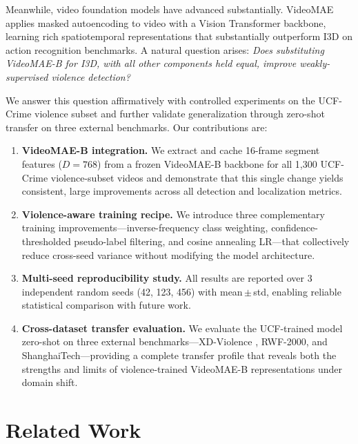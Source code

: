 \documentclass[11pt]{article}
\begin{document}
Meanwhile, video foundation models have advanced substantially.
VideoMAE \citep{tong2022videomae} applies masked autoencoding to video with
a Vision Transformer backbone, learning rich spatiotemporal representations
that substantially outperform I3D on action recognition benchmarks.
A natural question arises: \emph{Does substituting VideoMAE-B for I3D,
with all other components held equal, improve weakly-supervised violence
detection?}

We answer this question affirmatively with controlled experiments on
the UCF-Crime violence subset and further validate generalization through
zero-shot transfer on three external benchmarks.
Our contributions are:

\begin{enumerate}
  \item \textbf{VideoMAE-B integration.}
        We extract and cache 16-frame segment features ($D{=}768$) from a
        frozen VideoMAE-B backbone for all 1{,}300 UCF-Crime violence-subset
        videos and demonstrate that this single change yields consistent,
        large improvements across all detection and localization metrics.

  \item \textbf{Violence-aware training recipe.}
        We introduce three complementary training improvements—inverse-frequency
        class weighting, confidence-thresholded pseudo-label filtering, and
        cosine annealing LR—that collectively reduce cross-seed variance without
        modifying the model architecture.

  \item \textbf{Multi-seed reproducibility study.}
        All results are reported over 3 independent random seeds (42, 123, 456)
        with mean\,$\pm$\,std, enabling reliable statistical comparison with
        future work.

  \item \textbf{Cross-dataset transfer evaluation.}
        We evaluate the UCF-trained model zero-shot on three external
        benchmarks—XD-Violence \citep{wu2020not}, RWF-2000, and
        ShanghaiTech—providing a complete transfer profile that reveals
        both the strengths and limits of violence-trained VideoMAE-B
        representations under domain shift.
\end{enumerate}


\section{Related Work}
\end{document}
